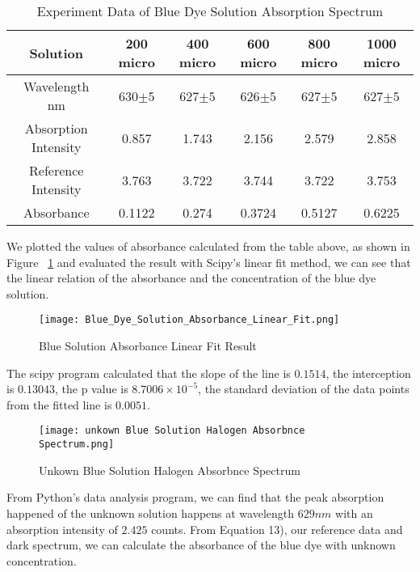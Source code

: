 \documentclass{article}
\begin{document}
\begin{table}[h!]
    \centering
    \begin{tabular}{|c|c|c|c|c|c|}
        \hline
       Solution  & 200 micro & 400 micro & 600 micro & 800 micro & 1000 micro\\
       \hline
       Wavelength nm & 630$\pm 5$ & 627$\pm 5$ & 626$\pm 5$ & 627$\pm 5$ & 627$\pm 5$\\
       \hline
       Absorption Intensity& 0.857 & 1.743 & 2.156 & 2.579 &2.858 \\
       \hline
       Reference Intensity & 3.763 & 3.722 & 3.744 & 3.722 & 3.753\\
       \hline
       Absorbance & 0.1122 & 0.274 & 0.3724 & 0.5127 &0.6225\\
       \hline
    \end{tabular}
    \caption{Experiment Data of Blue Dye Solution Absorption Spectrum}
    \label{tab:Blue_solution}
\end{table}

We plotted the values of absorbance calculated from the table above, as shown in Figure ~\ref{fig:my_label} and evaluated the result with Scipy's linear fit method, we can see that the linear relation of the absorbance and the concentration of the blue dye solution.

\begin{figure}[h!]
    \centering
    \texttt{[image: Blue\_Dye\_Solution\_Absorbance\_Linear\_Fit.png]}
    \caption{Blue Solution Absorbance Linear Fit Result}
    \label{fig:my_label}
\end{figure}

The scipy program calculated that the slope of the line is $0.1514$, the interception is $0.13043$, the p value is $8.7006 \times 10^{-5}$, the standard deviation of the data points from the fitted line is $0.0051$.

\begin{figure}[h!]
    \centering
    \texttt{[image: unkown Blue Solution Halogen Absorbnce Spectrum.png]}
    \caption{Unkown Blue Solution Halogen Absorbnce Spectrum}
    \label{fig:unkown}
\end{figure}
From Python's data analysis program, we can find that the peak absorption happened of the unknown solution happens at wavelength $629 nm$ with an absorption intensity of $2.425$ counts. From Equation 13), our reference data and dark spectrum, we can calculate the absorbance of the blue dye with unknown concentration.
\end{document}
